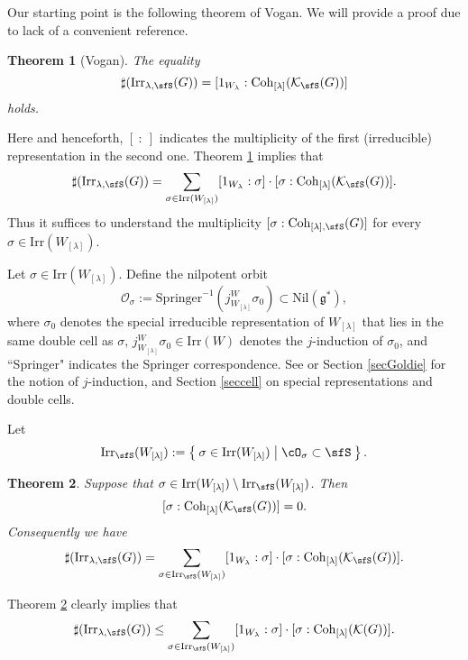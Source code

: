 \documentclass[12pt,a4paper]{amsart}
\newcommand{\CK}{{\mathcal {K}}}
\newcommand{\CO}{{\mathcal {O}}}
\newcommand{\g}{\mathfrak g}
\newcommand{\be}{\begin {equation}}
\newcommand{\ee}{\end {equation}}
\numberwithin{equation}{section}
\newtheorem{thm}{Theorem}[section]
\theoremstyle{remark}
\def\Irr{\mathrm{Irr}}
\def\WLam{W_{\Lam}}
\def\Coh{\mathrm{Coh}}
\providecommand{\nsubset}{\not\subset}
\newcommand{\Lam}{{[\lambda]}}
\begin{document}
Our starting point is the following theorem of Vogan. We will provide a proof due to lack of a convenient reference.
\begin{thm}[Vogan]\label{count1}
  The equality
  \[
    \sharp(\Irr_{\lambda,\sfS}(G)) = [1_{W_{\lambda}}:\Coh_{\Lam}(\CK_\sfS(G))]
  \]
  holds.
\end{thm}
Here and henceforth, $[\ : \ ]$ indicates the multiplicity of the first
(irreducible) representation in the second one. Theorem \ref{count1} implies
that
\[
  \sharp(\Irr_{\lambda,\sfS}(G)) = \sum_{\sigma\in \Irr(W_\Lam)} [1_{W_{\lambda}}: \sigma]\cdot [\sigma: \Coh_{\Lam}(\CK_\sfS(G))].
\]
Thus it suffices to understand the multiplicity $ [\sigma: \Coh_{\Lam,\sfS}(G)]$
for every $\sigma\in \Irr(W_\Lam)$.

Let $\sigma\in \Irr(W_\Lam)$. Define the
nilpotent orbit
\[
  \CO_\sigma:=\mathrm{Springer}^{-1}
  (j_{W_\Lam}^W \sigma_0)\subset \mathrm{Nil}(\g^*),
  \]
where $\sigma_0$ denotes the special irreducible representation of $W_\Lam$ that
lies in the same double cell as $\sigma$, $j_{W_\Lam}^W \sigma_0\in \Irr(W)$ denotes
the $j$-induction of $\sigma _0$, and  ``Springer"  indicates the Springer correspondence. See \cite[Chapter 11]{Carter} or Section \ref{secGoldie} for the notion of $j$-induction, and Section \ref{seccell} on special representations and double cells.


Let
\be\label{sfc}
  \Irr_\sfS(W_\Lam):= \Set{\sigma\in \Irr(\WLam)| \cO_{\sigma}\subset \sfS}.
\ee

\begin{thm}\label{count2}
  Suppose that $\sigma\in \Irr(W_\Lam)\setminus \Irr_\sfS(W_\Lam)$. Then
  \[
    [\sigma:\Coh_{\Lam}(\CK_\sfS(G))]=0.
  \]
Consequently we have
\begin{equation}\label{leq002}
  \sharp(\Irr_{\lambda,\sfS}(G)) = \sum_{\sigma \in \Irr_\sfS(W_\Lam)} [1_{W_{\lambda}}: \sigma]\cdot [\sigma:\Coh_{\Lam}(\CK_\sfS(G))].
  \end{equation}
\end{thm}


Theorem \ref{count2} clearly implies that
\begin{equation}\label{leq2}  \sharp(\Irr_{\lambda,\sfS}(G)) \leq  \sum_{\sigma \in \Irr_\sfS(W_\Lam)} [1_{W_{\lambda}}: \sigma]\cdot [\sigma:\Coh_{\Lam}(\CK(G))].
\end{equation}
\end{document}
